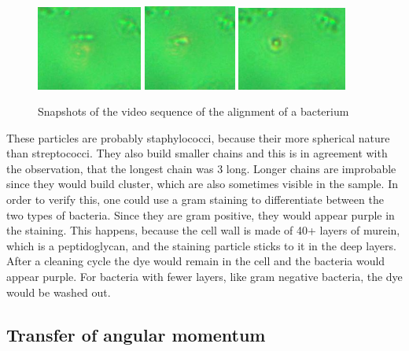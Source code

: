 \documentclass[12pt,english]{scrartcl}
\begin{document}
\begin{figure}[H]
	\centering
	\includegraphics[width=0.31\textwidth]{figures/lebewesen_1.JPG}
	\includegraphics[width=0.27\textwidth]{figures/lebewesen_2.JPG}
	\includegraphics[width=0.32\textwidth]{figures/lebewesen_3.JPG}
	\caption[Snapshots of the video sequence of the alignment of a bacterium ]{Snapshots of
		the video sequence of the alignment of a bacterium
	}\label{fig:bacterium}
\end{figure}

These particles are probably staphylococci, because their more spherical nature
than streptococci. They also build smaller chains and this is in agreement with
the observation, that the longest chain was 3 long. Longer chains are
improbable since they would build cluster, which are also sometimes visible in
the sample.\cite{Bakterienformen} In order to verify this, one could use a gram
staining to differentiate between the two types of bacteria. Since they are
gram positive, they would appear purple in the staining. This happens, because
the cell wall is made of 40+ layers of murein, which is a peptidoglycan, and
the staining particle sticks to it in the deep layers. After a cleaning cycle
the dye would remain in the cell and the bacteria would appear purple. For
bacteria with fewer layers, like gram negative bacteria, the dye would be
washed out.\cite{ghazalMicrobiologicalHygenicDiscussion2024}

\subsection{Transfer of angular momentum}\label{sec:AuswertungAngularMomentum}
\end{document}
